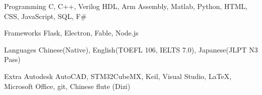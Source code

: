 
\begin{cvskills}
  \cvskill
    {Programming} %
    {C, C++, Verilog HDL, Arm Assembly, Matlab, Python, HTML, CSS, JavaScript, SQL, F\#} %

  \cvskill
    {Frameworks} %
    {Flask, Electron, Fable, Node.js} %
    
  \cvskill
    {Languages}
    {Chinese(Native), English(TOEFL 106, IELTS 7.0), Japanese(JLPT N3 Pass)}
    
  \cvskill
    {Extra} %
    {Autodesk AutoCAD, STM32CubeMX, Keil, Visual Studio, LaTeX, Microsoft Office, git, Chinese flute (Dizi)} %
\end{cvskills}
